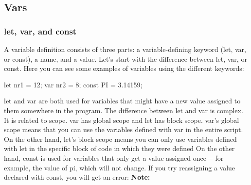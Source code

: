 \documentclass{report}
\begin{document}
    \pagebreak 
    \bigbreak \noindent 
    \subsection{Vars}
    \bigbreak \noindent 
    \subsubsection{let, var, and const}
    \bigbreak \noindent 
    A variable definition consists of three parts: a variable-defining keyword (let, var, or const), a name, and a value. Let's start with the difference between let, var, or const. Here you can see some examples of variables using the different keywords:
    \bigbreak \noindent 
    \begin{jscode}
        let nr1 = 12;
        var nr2 = 8;
        const PI = 3.14159;
    \end{jscode}
    \bigbreak \noindent 
    let and var are both used for variables that might have a new value assigned to them somewhere in the program. The difference between let and var is complex. It is related to scope.
    \bigbreak \noindent 
    var has global scope and let has block scope. var's global scope means that you can use the variables defined with var in the entire script. On the other hand, let's block scope means you can only use variables defined with let in the specific block of code in which they were defined
    \bigbreak \noindent 
    On the other hand, const is used for variables that only get a value assigned once— for example, the value of pi, which will not change. If you try reassigning a value declared with const, you will get an error:
    \bigbreak \noindent 
    \textbf{Note:}
























    
\end{document}
